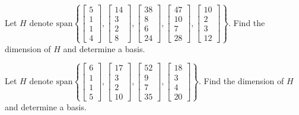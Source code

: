 \documentclass{ximera}
\begin{document}
\begin{problem}\label{prb:5.7} Let $H$ denote $\mbox{span}\left\{ \left[
\begin{array}{r}
5 \\
1 \\
1 \\
4
\end{array}
\right] ,\left[
\begin{array}{r}
14 \\
3 \\
2 \\
8
\end{array}
\right] ,\left[
\begin{array}{r}
38 \\
8 \\
6 \\
24
\end{array}
\right] ,\left[
\begin{array}{r}
47 \\
10 \\
7 \\
28
\end{array}
\right] ,\left[
\begin{array}{r}
10 \\
2 \\
3 \\
12
\end{array}
\right] \right\} .$ Find the dimension of $H$ and determine a basis.
\end{problem}

\begin{problem}\label{prb:5.8} Let $H$ denote $\mbox{span}\left\{ \left[
\begin{array}{r}
6 \\
1 \\
1 \\
5
\end{array}
\right] ,\left[
\begin{array}{r}
17 \\
3 \\
2 \\
10
\end{array}
\right] ,\left[
\begin{array}{r}
52 \\
9 \\
7 \\
35
\end{array}
\right] ,\left[
\begin{array}{r}
18 \\
3 \\
4 \\
20
\end{array}
\right] \right\} .$ Find the dimension of $H$ and determine a basis.
\end{problem}
\end{document}
